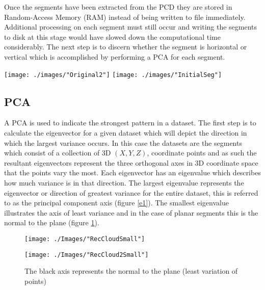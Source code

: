 Once the segments have been extracted from the PCD they are stored in Random-Access Memory (RAM) instead of being written to file immediately. Additional processing on each segment must still occur and writing the segments to disk at this stage would have slowed down the computational time considerably. The next step is to discern whether the segment is horizontal or vertical which is accomplished by performing a PCA for each segment. 

\clearpage

\begin{sidewaysfigure}[h!]
	\centering
	\texttt{[image: ./images/"Original2"]}
	\texttt{[image: ./images/"InitialSeg"]}
	\caption[Illustration of the resultant segmentation for Snape 3C]{\textbf{Scene:} Snape 3C. \textbf{Top:} Original point cloud. \textbf{ Bottom:} Point cloud illustrating each segment with a different colour. Red points do not belong to any segment.\label{initialSeg}}
\end{sidewaysfigure}
\clearpage

\subsection{PCA}
A PCA is used to indicate the strongest pattern in a dataset. The first step is to calculate the eigenvector for a given dataset which will depict the direction in which the largest variance occurs. In this case the datasets are the segments which consist of a collection of 3D $(X,Y,Z)$, coordinate points and as such the resultant eigenvectors represent the three orthogonal axes in 3D coordinate space that the points vary the most. Each eigenvector has an eigenvalue which describes how much variance is in that direction. The largest eigenvalue represents the eigenvector or direction of greatest variance for the entire dataset, this is referred to as the principal component axis (figure \ref{e1}). The smallest eigenvalue illustrates the axis of least variance and in the case of planar segments this is the normal to the plane (figure \ref{e2}). 
\newline

\begin{figure}[!h]
	\centering
	\begin{minipage}{.45\linewidth}
		\texttt{[image: ./Images/"RecCloudSmall"]}
		\caption[Illustration of the principal component axis]{The red axis represents the principal component (largest variation of points)}
		\label{e1}
	\end{minipage}
	\hspace{.05\linewidth}
	\begin{minipage}{0.45\linewidth}
		\texttt{[image: ./Images/"RecCloud2Small"]}
		\caption[Illustration of the normal to the plane]{The black axis represents the normal to the plane (least variation of points)}
		\label{e2}
	\end{minipage}
\end{figure}
\vspace{-3mm}

